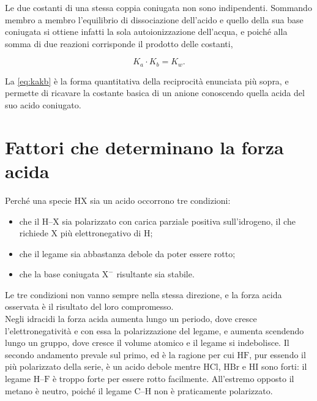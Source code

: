 Le due costanti di una stessa coppia coniugata non sono indipendenti.
Sommando membro a membro l'equilibrio di dissociazione dell'acido e quello della sua base coniugata si ottiene infatti la sola autoionizzazione dell'acqua, e poiché alla somma di due reazioni corrisponde il prodotto delle costanti,

\begin{equation}
    K_a \cdot K_b = K_w .
    \label{eq:kakb}
\end{equation}

La \eqref{eq:kakb} è la forma quantitativa della reciprocità enunciata più sopra, e permette di ricavare la costante basica di un anione conoscendo quella acida del suo acido coniugato.
 
\section{Fattori che determinano la forza acida}
 
Perché una specie $\mathrm{HX}$ sia un acido occorrono tre condizioni: 

\begin{itemize}
    \item che il $\mathrm{H}$--$\mathrm{X}$ sia polarizzato con carica parziale positiva sull'idrogeno, il che richiede $\mathrm{X}$ più elettronegativo di $\mathrm{H}$;
    \item che il legame sia abbastanza debole da poter essere rotto;
    \item che la base coniugata $\mathrm{X^-}$ risultante sia stabile.
\end{itemize}

Le tre condizioni non vanno sempre nella stessa direzione, e la forza acida osservata è il risultato del loro compromesso.\\
 
Negli idracidi la forza acida aumenta lungo un periodo, dove cresce l'elettronegatività e con essa la polarizzazione del legame, e aumenta scendendo lungo un gruppo, dove cresce il volume atomico e il legame si indebolisce.
Il secondo andamento prevale sul primo, ed è la ragione per cui $\mathrm{HF}$, pur essendo il più polarizzato della serie, è un acido debole mentre $\mathrm{HCl}$, $\mathrm{HBr}$ e $\mathrm{HI}$ sono forti: il legame $\mathrm{H}$--$\mathrm{F}$ è troppo forte per essere rotto facilmente.
All'estremo opposto il metano è neutro, poiché il legame $\mathrm{C}$--$\mathrm{H}$ non è praticamente polarizzato.

